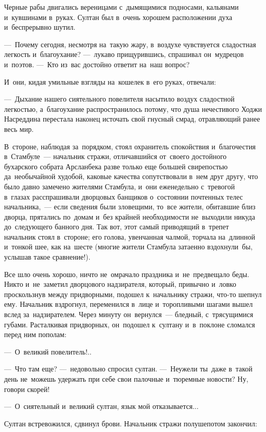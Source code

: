 \documentclass[12pt,a4paper]{book}
\begin{document}
Черные рабы двигались вереницами с~дымящимися подносами, кальянами и~кувшинами в~руках. Султан был в~очень хорошем расположении духа и~беспрерывно шутил.

—~Почему сегодня, несмотря на~такую жару, в~воздухе чувствуется сладостная легкость и~благоухание? —~лукаво прищурившись, спрашивал он~мудрецов и~поэтов. —~Кто из~вас достойно ответит на~наш вопрос?

И~они, кидая умильные взгляды на~кошелек в~его руках, отвечали:

—~Дыхание нашего сиятельного повелителя насытило воздух сладостной легкостью, а~благоухание распространилось потому, что душа нечестивого Ходжи Насреддина перестала наконец источать свой гнусный смрад, отравляющий ранее весь мир.

В~стороне, наблюдая за~порядком, стоял охранитель спокойствия и~благочестия в~Стамбуле~— начальник стражи, отличавшийся от~своего достойного бухарского собрата Арсланбека разве только еще большей свирепостью да~необычайной худобой, каковые качества сопутствовали в~нем друг другу, что было давно замечено жителями Стамбула, и~они еженедельно с~тревогой в~глазах расспрашивали дворцовых банщиков о~состоянии почтенных телес начальника,~— если сведения были зловещими, то~все жители, обитавшие близ дворца, прятались по~домам и~без крайней необходимости не~выходили никуда до~следующего банного дня. Так вот, этот самый приводящий в~трепет начальник стоял в~стороне; его голова, увенчанная чалмой, торчала на~длинной и~тонкой шее, как на~шесте (многие жители Стамбула затаенно вздохнули~бы, услышав такое сравнение!).

Все шло очень хорошо, ничто не~омрачало праздника и~не~предвещало беды. Никто и~не~заметил дворцового надзирателя, который, привычно и~ловко проскользнув между придворными, подошел к~начальнику стражи, что-то шепнул ему. Начальник вздрогнул, переменился в~лице и~торопливыми шагами вышел вслед за~надзирателем. Через минуту он~вернулся~— бледный, с~трясущимися губами. Расталкивая придворных, он~подошел к~султану и~в~поклоне сломался перед ним пополам:

—~О~великий повелитель!..

—~Что там еще? —~недовольно спросил султан. —~Неужели ты~даже в~такой день не~можешь удержать при себе свои палочные и~тюремные новости? Ну, говори скорей!

—~О~сиятельный и~великий султан, язык мой отказывается...

Султан встревожился, сдвинул брови. Начальник стражи полушепотом закончил:
\end{document}
